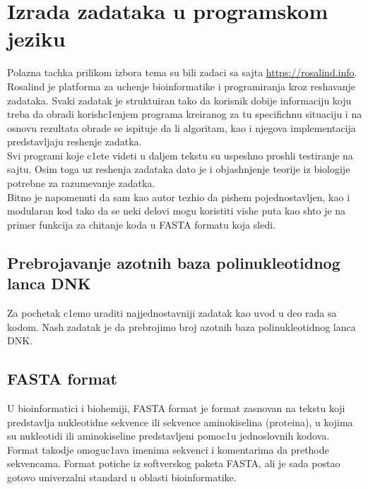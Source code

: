 \documentclass[12pt]{article}
\newcommand\eng{\fontencoding{OT1}\fontfamily{\rmdefault}\selectfont}
\newcommand\srb{\fontencoding{OT2}\fontfamily{\rmdefault}\selectfont}
\begin{document}
\section{Izrada zadataka u programskom jeziku \eng{C++}\srb} %

Polazna tachka prilikom izbora tema su bili zadaci sa sajta \eng\url{https://rosalind.info}\srb. Rosalind je platforma za uchenje bioinformatike i programiranja kroz reshavanje zadataka. Svaki zadatak je struktuiran tako da korisnik dobije informaciju koju treba da obradi korish\/c1enjem programa kreiranog za tu specifichnu situaciju i na osnovu rezultata obrade se ispituje da li algoritam, kao i njegova implementacija predstavljaju reshenje zadatka.\\

Svi programi koje c1ete videti u daljem tekstu su uspeshno proshli testiranje na sajtu. Osim toga uz reshenja zadataka dato je i objashnjenje teorije iz biologije potrebne za razumevanje zadatka.\\

Bitno je napomenuti da sam kao autor tezhio da pishem pojednostavljen, kao i modularan kod tako da se neki delovi mogu koristiti vishe puta kao shto je na primer funkcija za chitanje koda u FASTA formatu koja sledi.
\subsection{Prebrojavanje azotnih baza polinukleotidnog lanca DNK}
Za pochetak c1emo uraditi najjednostavniji zadatak kao uvod u deo rada sa kodom. Nash zadatak je da prebrojimo broj azotnih baza polinukleotidnog lanca DNK.\\

\begin{minipage}{\textwidth}\eng\srb\end{minipage}
\begin{minipage}{\textwidth}\eng\srb\end{minipage}
\subsection{FASTA format}

U bioinformatici i biohemiji, FASTA format je format zasnovan na tekstu koji predstavlja nukleotidne sekvence ili sekvence aminokiselina (proteina), u kojima su nukleotidi ili aminokiseline predstavljeni pomoc1u jednoslovnih kodova. Format takodje omoguc1ava imenima sekvenci i komentarima da prethode sekvencama. Format potiche iz softverskog paketa FASTA, ali je sada postao gotovo univerzalni standard u oblasti bioinformatike.\\
\end{document}
